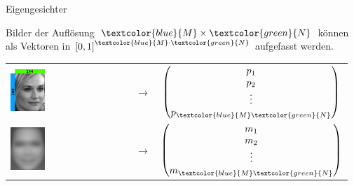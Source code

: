 \documentclass[10pt,aspectratio=169]{beamer}
\begin{document}
\begin{frame}[fragile]{Eigengesichter}
	\begin{center}
		Bilder der Auflösung $\textcolor{blue}{M}\times\textcolor{green}{N}$ können als Vektoren in $\left[0,1\right]^{\textcolor{blue}{M}\cdot\textcolor{green}{N}}$ aufgefasst werden.
	\end{center}
	\begin{minipage}{0.45\textwidth}
		\begin{tabular}{m{2.0cm} m{0.5cm} c}
			\includegraphics[width=0.3\textwidth]{images/vectormatrix/ImageToVector} &
			$\longrightarrow$ &
			$\begin{pmatrix}
				p_{1} \\
				p_{2} \\
				\vdots \\
				p_{\textcolor{blue}{M}\textcolor{green}{N}} \\
			\end{pmatrix}$ \\
			\includegraphics[width=0.3\textwidth]{images/facespace/meanface} &
			$\longrightarrow$ &
			$\begin{pmatrix}
				m_{1} \\
				m_{2} \\
				\vdots \\
				m_{\textcolor{blue}{M}\textcolor{green}{N}} \\
			\end{pmatrix}$
		\end{tabular}
	\end{minipage}

\end{frame}
\end{document}
